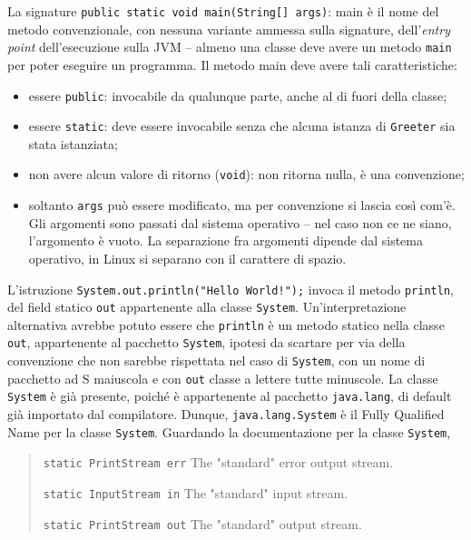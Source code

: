 \documentclass[\fontsizeclass,twocolumn]{\classname}
\theoremstyle{definition}
\theoremstyle{definition}
\begin{document}
La signature \texttt{public static void main(String[] args)}: main è il nome
del metodo convenzionale, con nessuna variante ammessa sulla signature,
dell'\emph{entry point} dell'esecuzione sulla JVM \--- almeno una classe deve
avere un metodo \texttt{main} per poter eseguire un programma. Il metodo main
deve avere tali caratteristiche:
\begin{itemize}
    \item essere \texttt{public}: invocabile da qualunque parte, anche al di
        fuori della classe;
    \item essere \texttt{static}: deve essere invocabile senza che alcuna
        istanza di \texttt{Greeter} sia stata istanziata;
    \item non avere alcun valore di ritorno (\texttt{void}): non ritorna nulla,
        è una convenzione;
    \item soltanto \texttt{args} può essere modificato, ma per convenzione si
        lascia così com'è. Gli argomenti sono passati dal sistema operativo
        \--- nel caso non ce ne siano, l'argomento è vuoto. La separazione fra
        argomenti dipende dal sistema operativo, in Linux si separano con il
        carattere di spazio.
\end{itemize}

L'istruzione \texttt{System.out.println("Hello World!");} invoca il metodo
\texttt{println}, del field statico \texttt{out} appartenente alla classe
\texttt{System}. Un'interpretazione alternativa avrebbe potuto essere che
\texttt{println} è un metodo statico nella classe \texttt{out}, appartenente al
pacchetto \texttt{System}, ipotesi da scartare per via della convenzione che
non sarebbe rispettata nel caso di \texttt{System}, con un nome di pacchetto ad
S maiuscola e con \texttt{out} classe a lettere tutte minuscole. La classe
\texttt{System} è già presente, poiché è appartenente al pacchetto
\texttt{java.lang}, di default già importato dal compilatore. Dunque,
\texttt{java.lang.System} è il Fully Qualified Name per la classe
\texttt{System}. Guardando la documentazione per la classe \texttt{System},

\begin{quote}
    \footnotesize{\texttt{static PrintStream 	err} The "standard" error output stream.

    \texttt{static InputStream 	in} The "standard" input stream.

    \texttt{static PrintStream 	out} The "standard" output stream.
    }
\end{quote}
\end{document}
